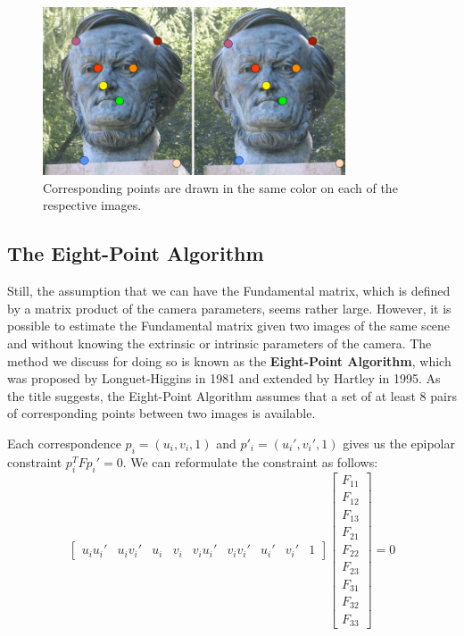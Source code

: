 \documentclass[a4paper, 12pt]{article}
\renewcommand\emph{\textbf}
\begin{document}
\begin{figure}[h!]
\centering
\includegraphics[width=0.8\textwidth]{figures/correspondence.png}
\caption{Corresponding points are drawn in the same color on each of the respective images.}
\label{fig:correspondence}
\end{figure}

\subsection{The Eight-Point Algorithm}
Still, the assumption that we can have the Fundamental matrix, which is defined by a matrix product of the camera parameters, seems rather large. However, it is possible to estimate the Fundamental matrix given two images of the same scene and without knowing the extrinsic or intrinsic parameters of the camera. The method we discuss for doing so is known as the \emph{Eight-Point Algorithm}, which was proposed by Longuet-Higgins in 1981 and extended by Hartley in 1995. As the title suggests, the Eight-Point Algorithm assumes that a set of at least 8 pairs of corresponding points between two images is available.

Each correspondence $p_i = (u_i, v_i, 1)$ and $p'_i = (u_i', v_i', 1)$ gives us the epipolar constraint $p_i^T F p_i' = 0$. We can reformulate the constraint as follows:
\begin{equation}
    \begin{bmatrix}u_iu_i' & u_iv_i' & u_i & v_i & v_iu_i' & v_iv_i' & u_i' & v_i' & 1\end{bmatrix}
    \begin{bmatrix}F_{11}\\F_{12}\\F_{13}\\F_{21}\\F_{22}\\F_{23}\\F_{31}\\F_{32}\\F_{33}\end{bmatrix} = 0
\end{equation}
\end{document}
